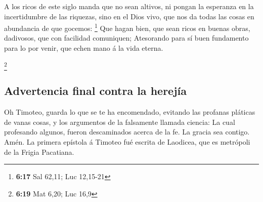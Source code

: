  A los ricos de este siglo manda que no sean altivos, ni
pongan la esperanza en la incertidumbre de las riquezas, sino en el Dios
vivo, que nos da todas las cosas en abundancia de que gocemos:
\footnote{\textbf{6:17} Sal 62,11; Luc 12,15-21}  Que
hagan bien, que sean ricos en buenas obras, dadivosos, que con facilidad
comuniquen;  Atesorando para sí buen fundamento para lo
por venir, que echen mano á la vida eterna.

\footnote{\textbf{6:19} Mat 6,20; Luc 16,9}

\hypertarget{advertencia-final-contra-la-herejuxeda}{%
\subsection{Advertencia final contra la
herejía}\label{advertencia-final-contra-la-herejuxeda}}

 Oh Timoteo, guarda lo que se te ha encomendado, evitando
las profanas pláticas de vanas cosas, y los argumentos de la falsamente
llamada ciencia:  La cual profesando algunos, fueron
descaminados acerca de la fe. La gracia sea contigo. Amén. La primera
epístola á Timoteo fué escrita de Laodicea, que es metrópoli de la
Frigia Pacatiana.
